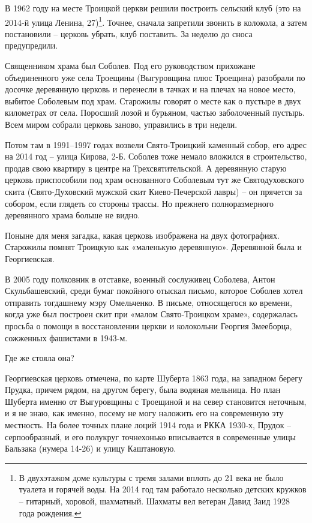 В 1962 году на месте Троицкой церкви решили построить сельский клуб (это на 2014-й улица Ленина, 27)\footnote{В двухэтажом доме культуры с тремя залами вплоть до 21 века не было туалета и горячей воды. На 2014 год там работало несколько детских кружков – гитарный, хоровой, шахматный. Шахматы вел ветеран Давид Заид 1928 года рождения.}. Точнее, сначала запретили звонить в колокола, а затем постановили – церковь убрать, клуб поставить. За неделю до сноса предупредили. 

Священником храма был Соболев. Под его руководством прихожане объединенного уже села Троещины (Выгуровщина плюс Троещина) разобрали по досочке деревянную церковь и перенесли в тачках и на плечах на новое место, выбитое Соболевым под храм. Старожилы говорят о месте как о пустыре в двух километрах от села. Поросший лозой и бурьяном, частью заболоченный пустырь. Всем миром собрали церковь заново, управились в три недели.

Потом там в 1991–1997 годах возвели Свято-Троицкий каменный собор, его адрес на 2014 год – улица Кирова, 2-Б. Соболев тоже немало вложился в строительство, продав свою квартиру в центре на Трехсвятительской. А деревянную старую церковь приспособили под храм основанного Соболевым тут же Святодуховского скита (Свято-Духовский мужской скит Киево-Печерской лавры) – он прячется за собором, если глядеть со стороны трассы. Но прежнего полноразмерного деревянного храма больше не видно. 

Поныне для меня загадка, какая церковь изображена на двух фотографиях. Старожилы помнят Троицкую как «маленькую деревянную». Деревянной была и Георгиевская.

В 2005 году полковник в отставке, военный сослуживец Соболева, Антон Скульбашевский, среди бумаг покойного отыскал письмо, которое Соболев хотел отправить тогдашнему мэру Омельченко. В письме, относящегося ко времени, когда уже был построен скит при «малом Свято-Троицком храме», содержалась просьба о помощи в восстановлении церкви и колокольни Георгия Змееборца, сожженных фашистами в 1943-м.

Где же стояла она? 

Георгиевская церковь отмечена, по карте Шуберта 1863 года, на западном берегу Прудка, причем рядом, на другом берегу, была водяная мельница. Но план Шуберта именно от Выгуровщины с Троещиной и на север становится неточным, и я не знаю, как именно, посему не могу наложить его на современную эту местность. На более точных плане лоций 1914 года и РККА 1930-х, Прудок – серпообразный, и его полукруг точнехонько вписывается в современные улицы Бальзака (нумера 14-26) и улицу Каштановую. 

